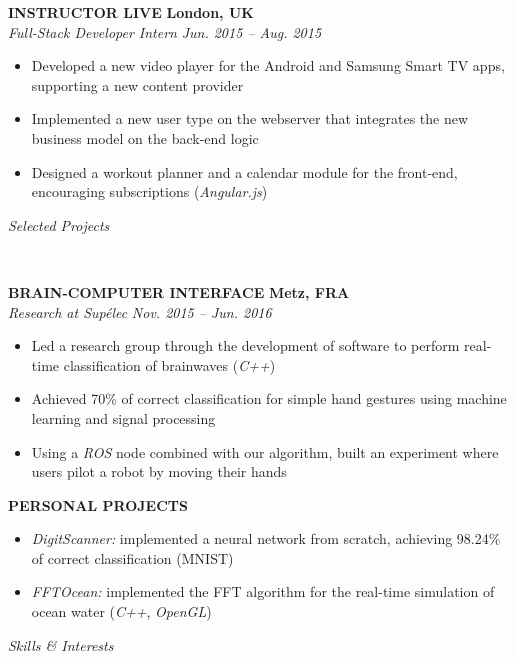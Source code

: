 \documentclass[a4paper, 12pt]{article}
\newcommand{\marginline}{-0.3cm}
\newcommand{\margincontent}{-0.6cm}
\newcommand{\marginbeforesection}{0.45cm}
\newcommand{\marginbeforemisc}{-0.75cm}
\newcommand{\linewidthperso}{0.02cm}
\newcommand{\styletitle}[1]{\textbf{#1}}
\newcommand{\styledesc}[1]{\textit{#1}}
\newcommand{\styleloc}[1]{\textbf{#1}}
\newcommand{\styledates}[1]{\textit{#1}}
\newcommand{\stylesection}[1]{
  \vspace{\marginbeforesection}
  \begin{normalsize}\textit{#1}\end{normalsize}
  \vspace{\marginline}\\
  \noindent\makebox[\linewidth]{\rule{\textwidth}{\linewidthperso}}

}
\begin{document}
\begin{footnotesize}
\styletitle{INSTRUCTOR LIVE} \hfill \styleloc{London, UK}\\
\styledesc{Full-Stack Developer Intern} \hfill \styledates{Jun. 2015 -- Aug. 2015}\\
\vspace{\margincontent}
\begin{itemize}
  \item Developed a new video player for the Android and Samsung Smart TV apps, supporting a new content provider
  \item Implemented a new user type on the webserver that integrates the new business model on the back-end logic
  \item Designed a workout planner and a calendar module for the front-end, encouraging subscriptions (\textit{Angular.js})
\end{itemize}

\stylesection{Selected Projects}
   
\styletitle{BRAIN-COMPUTER INTERFACE} \hfill \styleloc{Metz, FRA}\\
\styledesc{Research at Sup\'elec} \hfill \styledates{Nov. 2015 -- Jun. 2016}\\
\vspace{\margincontent}
\begin{itemize}
  \item Led a research group through the development of software to perform real-time classification of brainwaves (\textit{C++}) 
  \item Achieved 70\% of correct classification for simple hand gestures using machine learning and signal processing
  \item Using a \textit{ROS} node combined with our algorithm, built an experiment where users pilot a robot by moving their hands 
\end{itemize}

\styletitle{PERSONAL PROJECTS}\\
\vspace{\margincontent}
\begin{itemize}
  \item \textit{DigitScanner:} implemented a neural network from scratch, achieving 98.24\% of correct classification (MNIST)
  \item \textit{FFTOcean:} implemented the FFT algorithm for the real-time simulation of ocean water (\textit{C++}, \textit{OpenGL})
\end{itemize}

\stylesection{Skills \& Interests}
~\\
\vspace{\marginbeforemisc}


\end{footnotesize}
\end{document}
